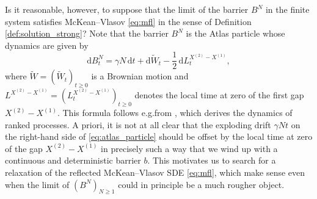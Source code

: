 \documentclass[11pt, a4paper]{article}
\theoremstyle{plain}
\theoremstyle{definition}
\theoremstyle{remark}
\numberwithin{equation}{section}
\newcommand{\ev}{\mathbb{E}}
\renewcommand{\d}{\mathrm{d}}
\begin{document}
Is it reasonable, however, to suppose that the limit of the barrier $B^N$ in the finite system satisfies McKean--Vlasov \eqref{eq:mfl} in the sense of Definition \ref{def:solution_strong}? Note that the barrier $B^N$ is the Atlas particle whose dynamics are given by
\begin{equation} \label{eq:atlas_particle}
    \d B^N_t = \gamma N \, \d t + \d \tilde{W}_t - \frac{1}{2} \, \d L^{X^{(2)} - X^{(1)}}_t,
\end{equation}
where $\tilde{W} = (\tilde{W}_t)_{t \geq 0}$ is a Brownian motion and $L^{X^{(2)} - X^{(1)}} = (L^{X^{(2)} - X^{(1)}}_t)_{t \geq 0}$ denotes the local time at zero of the first gap $X^{(2)} - X^{(1)}$. This formula follows e.g.\@ from \cite[Proposition 4.1.11]{fernholz_spt_2002}, which derives the dynamics of ranked processes. A priori, it is not at all clear that the exploding drift $\gamma N t$ on the right-hand side of \eqref{eq:atlas_particle} should be offset by the local time at zero of the gap $X^{(2)} - X^{(1)}$ in precisely such a way that we wind up with a continuous and deterministic barrier $b$. This motivates us to search for a relaxation of the reflected McKean--Vlasov SDE \eqref{eq:mfl}, which make sense even when the limit of $(B^N)_{N \geq 1}$ could in principle be a much rougher object.
\end{document}
